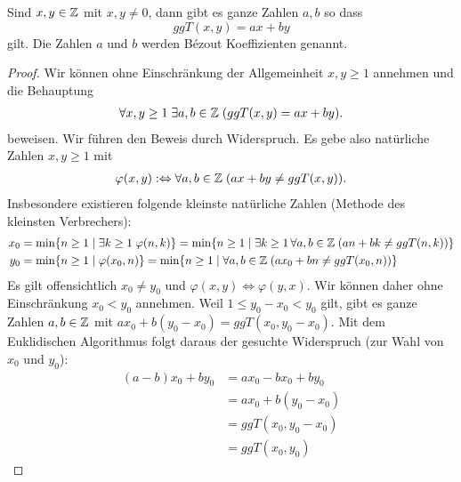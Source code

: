 \begin{thrm}\label{hauptideal}
Sind $x,y\in\mathbb{Z}$ mit $x,y\neq 0$, dann gibt es ganze Zahlen $a,b$ so dass
\[
 ggT(x,y)=ax+by
\]
gilt. Die Zahlen $a$ und $b$ werden Bézout Koeffizienten genannt.
\end{thrm}
\begin{proof}
	Wir können ohne Einschränkung der Allgemeinheit $x,y\geq 1$ annehmen und die Behauptung
	\begin{align*}
		\forall x,y\geq 1\;\exists a,b\in\mathbb{Z}\;(ggT(x,y)=ax+by).
	\end{align*}
	beweisen. Wir führen den Beweis durch Widerspruch. Es gebe also natürliche Zahlen $x,y\geq 1$ mit
	\begin{align*}
		\varphi(x,y):\Leftrightarrow \forall a,b\in\mathbb{Z}\;(ax+by\neq ggT(x,y)).
	\end{align*}
	Insbesondere existieren folgende kleinste natürliche Zahlen (Methode des kleinsten Verbrechers):
	\begin{align*}
		x_0&=\min \{n\geq 1 \mid \exists k\geq 1\;\varphi(n,k)\} = \min\{n\geq 1 \mid \exists k\geq 1\,\forall a,b\in\mathbb{Z}\;(an+bk\neq ggT(n,k))\}\\
		y_0&=\min \{n\geq 1 \mid \varphi(x_0,n)\}=\min\{n\geq 1 \mid \forall a,b\in\mathbb{Z}\;(ax_0+bn\neq ggT(x_0,n))\}
	\end{align*}
	Es gilt offensichtlich $x_0\neq y_0$ und $\varphi(x,y)\Leftrightarrow\varphi(y,x)$. Wir können daher ohne Einschränkung $x_0<y_0$ annehmen. Weil $1\leq y_0-x_0<y_0$ gilt, gibt es ganze Zahlen $a,b\in\mathbb{Z}$ mit $ax_0+b(y_0-x_0) = ggT(x_0,y_0-x_0)$. Mit dem Euklidischen Algorithmus folgt daraus der gesuchte Widerspruch (zur Wahl von $x_0$ und $y_0$):
	\begin{align*}
		(a-b)x_0+by_0 &=ax_0-bx_0+by_0\\
				      &=ax_0+b(y_0-x_0)\\
					  &= ggT(x_0,y_0-x_0)\\
					  &=ggT(x_0,y_0)
	\end{align*}




\end{proof}

